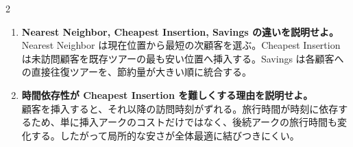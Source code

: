 \begin{multicols}{2}
\begin{enumerate}
\item \textbf{Nearest Neighbor, Cheapest Insertion, Savings の違いを説明せよ。}\\
Nearest Neighbor は現在位置から最短の次顧客を選ぶ。Cheapest Insertion は未訪問顧客を既存ツアーの最も安い位置へ挿入する。Savings は各顧客への直接往復ツアーを、節約量が大きい順に統合する。
\item \textbf{時間依存性が Cheapest Insertion を難しくする理由を説明せよ。}\\
顧客を挿入すると、それ以降の訪問時刻がずれる。旅行時間が時刻に依存するため、単に挿入アークのコストだけではなく、後続アークの旅行時間も変化する。したがって局所的な安さが全体最適に結びつきにくい。
\end{enumerate}

\end{multicols}

\clearpage



\vspace{1.5mm}

